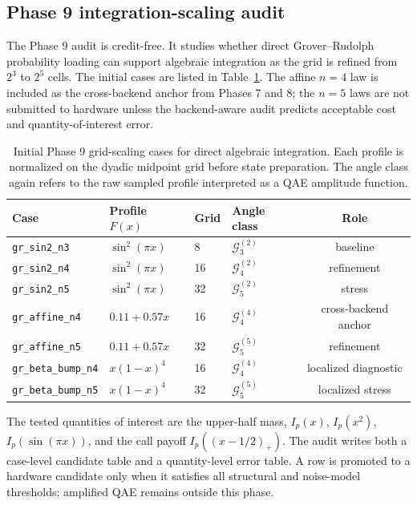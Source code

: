 \subsection{Phase 9 integration-scaling audit}

The Phase 9 audit is credit-free. It studies whether direct
Grover--Rudolph probability loading can support algebraic integration as the
grid is refined from \(2^3\) to \(2^5\) cells. The initial cases are listed in
Table~\ref{tab:phase9-scaling-cases}. The affine \(n=4\) law is included as the
cross-backend anchor from Phases 7 and 8; the \(n=5\) laws are not submitted to
hardware unless the backend-aware audit predicts acceptable cost and
quantity-of-interest error.

\begin{table}[h]
\centering
\begin{tabular}{llllc}
\toprule
Case & Profile \(F(x)\) & Grid & Angle class & Role \\
\midrule
\texttt{gr\_sin2\_n3} & \(\sin^2(\pi x)\) & 8 & \(\mathcal{G}^{(2)}_3\) & baseline \\
\texttt{gr\_sin2\_n4} & \(\sin^2(\pi x)\) & 16 & \(\mathcal{G}^{(2)}_4\) & refinement \\
\texttt{gr\_sin2\_n5} & \(\sin^2(\pi x)\) & 32 & \(\mathcal{G}^{(2)}_5\) & stress \\
\texttt{gr\_affine\_n4} & \(0.11+0.57x\) & 16 & \(\mathcal{G}^{(4)}_4\) & cross-backend anchor \\
\texttt{gr\_affine\_n5} & \(0.11+0.57x\) & 32 & \(\mathcal{G}^{(5)}_5\) & refinement \\
\texttt{gr\_beta\_bump\_n4} & \(x(1-x)^4\) & 16 & \(\mathcal{G}^{(4)}_4\) & localized diagnostic \\
\texttt{gr\_beta\_bump\_n5} & \(x(1-x)^4\) & 32 & \(\mathcal{G}^{(5)}_5\) & localized stress \\
\bottomrule
\end{tabular}
\caption{Initial Phase 9 grid-scaling cases for direct algebraic integration.
Each profile is normalized on the dyadic midpoint grid before state
preparation. The angle class again refers to the raw sampled profile interpreted
as a QAE amplitude function.}
\label{tab:phase9-scaling-cases}
\end{table}

The tested quantities of interest are the upper-half mass, \(I_p(x)\),
\(I_p(x^2)\), \(I_p(\sin(\pi x))\), and the call payoff
\(I_p((x-1/2)_+)\). The audit writes both a case-level candidate table and a
quantity-level error table. A row is promoted to a hardware candidate only when
it satisfies all structural and noise-model thresholds; amplified QAE remains
outside this phase.


